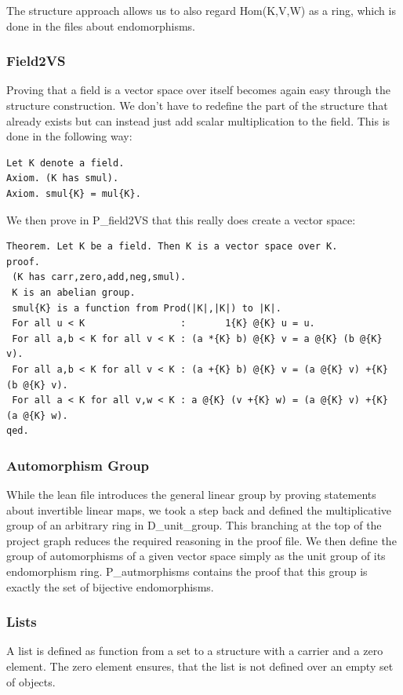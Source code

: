 \documentclass[11pt]{article}
\begin{document}
The {\ftl structure} approach allows us to also regard {\ftl Hom(K,V,W)} as a ring, which is done in the files about endomorphisms.

\subsubsection{Field2VS} \label{field2VS}
Proving that a field is a vector space over itself becomes again easy through the structure construction. We don't have to redefine the part of the structure that already exists but can instead just add scalar multiplication to the field. This is done in the following way:
\begin{lstlisting}
Let K denote a field.
Axiom. (K has smul).
Axiom. smul{K} = mul{K}.
\end{lstlisting}
We then prove in P\_field2VS that this really does create a vector space:
\begin{lstlisting}
Theorem. Let K be a field. Then K is a vector space over K.
proof.
 (K has carr,zero,add,neg,smul).
 K is an abelian group.
 smul{K} is a function from Prod(|K|,|K|) to |K|.
 For all u < K                 :       1{K} @{K} u = u.
 For all a,b < K for all v < K : (a *{K} b) @{K} v = a @{K} (b @{K} v).
 For all a,b < K for all v < K : (a +{K} b) @{K} v = (a @{K} v) +{K} (b @{K} v).
 For all a < K for all v,w < K : a @{K} (v +{K} w) = (a @{K} v) +{K} (a @{K} w).
qed.
\end{lstlisting}


\subsubsection{Automorphism Group}
While the lean file introduces the general linear group by proving statements about invertible linear maps, we took a step back and defined the multiplicative group of an arbitrary ring in D\_unit\_group. This branching at the top of the project graph reduces the required reasoning in the proof file.
We then define the group of automorphisms of a given vector space simply as the unit group of its endomorphism ring. P\_autmorphisms contains the proof that this group is exactly the set of bijective endomorphisms.

\subsubsection{Lists}

A list is defined as function from a set to a structure with a carrier and a zero element. The zero element ensures, that the list is not defined over an empty set of objects.
\end{document}
